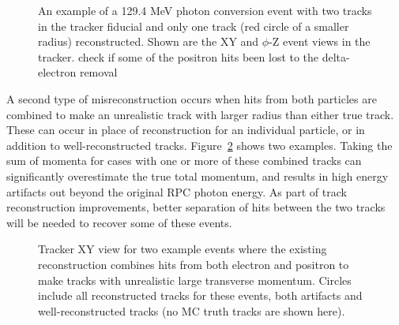 \begin{figure}[H]
  \caption{
    \label{figure:sum_mom_vd13}
    An example of a 129.4 MeV photon conversion event with two tracks
    in the tracker fiducial and only one track (red circle of a smaller radius)
    reconstructed. Shown are the XY and $\phi$-Z event views in the tracker.
    {\red check if some of the positron hits been lost to the delta-electron removal}
  }
  \label{figure:event_display}
\end{figure}

A second type of misreconstruction occurs when hits from both particles are combined to make an unrealistic track with larger radius than either true track. These can occur in place of reconstruction for an individual particle, or in addition to well-reconstructed tracks. Figure~\ref{figure:he_artifact_evts} shows two examples. Taking the sum of momenta for cases with one or more of these combined tracks can significantly overestimate the true total momentum, and results in high energy artifacts out beyond the original RPC photon energy. As part of track reconstruction improvements, better separation of hits between the two tracks will be needed to recover some of these events. 

\begin{figure}[H]
  \caption{
    \label{figure:he_artifact_evts}
   Tracker XY view for two example events where the existing reconstruction combines hits from both electron and positron to make tracks with unrealistic large transverse momentum. Circles include all reconstructed tracks for these events, both artifacts and well-reconstructed tracks (no MC truth tracks are shown here). 
  }
  \label{figure:he_artifact_evts}
\end{figure}


